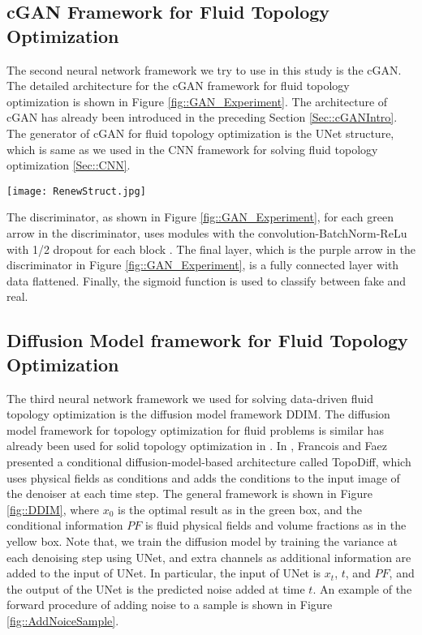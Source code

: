 \documentclass{article}
\begin{document}
\subsection{cGAN Framework for Fluid Topology Optimization}
The second neural network framework we try to use in this study is the cGAN. The detailed architecture for the cGAN framework for fluid topology optimization is shown in Figure \ref{fig::GAN_Experiment}. The architecture of cGAN has already been introduced in the preceding Section \ref{Sec::cGANIntro}. The generator of cGAN for fluid topology optimization is the UNet structure, which is same as we used in the CNN framework for solving fluid topology optimization \ref{Sec::CNN}.
\begin{figure*}
    \centering
    \texttt{[image: RenewStruct.jpg]}
    \caption{The architecture of cGAN model for fluid-based topology optimization}
    \label{fig::GAN_Experiment}
\end{figure*}
The discriminator, as shown in Figure \ref{fig::GAN_Experiment}, 
 for each green arrow in the discriminator, uses modules with the convolution-BatchNorm-ReLu with 1/2 dropout for each block \cite{9-3-ioffe2015batch}. The final layer, which is the purple arrow in the discriminator in Figure \ref{fig::GAN_Experiment}, is a fully connected layer with data flattened. Finally, the sigmoid function is used to classify between fake and real.

\subsection{Diffusion Model framework for Fluid Topology Optimization}
The third neural network framework we used for solving data-driven fluid topology optimization is the diffusion model framework DDIM. The diffusion model framework for topology optimization for fluid problems is similar has already been used for solid topology optimization in \cite{6-9-maze2022diffusion}. In \cite{6-9-maze2022diffusion}, Francois and Faez presented a conditional diffusion-model-based architecture called TopoDiff, which uses physical fields as conditions and adds the conditions to the input image of the denoiser at each time step.
The general framework is shown in Figure \ref{fig::DDIM}, where $x_0$ is the optimal result as in the green box, and the conditional information $PF$ is fluid physical fields and volume fractions as in the yellow box. Note that, we train the diffusion model by training the variance at each denoising step using UNet, and extra channels as additional information are added to the input of UNet. In particular, the input of UNet is $x_t$, $t$, and $PF$, and the output of the UNet is the predicted noise added at time $t$. An example of the forward procedure of adding noise to a sample is shown in Figure \ref{fig::AddNoiceSample}.
\end{document}
